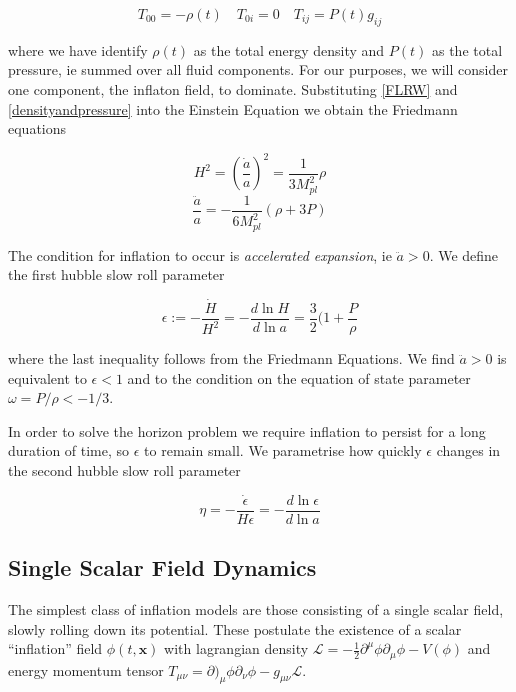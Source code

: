 \documentclass[a4paper,11pt]{article}
\renewcommand{\v}[1]{\mathbf{#1}}
\newcommand{\Mp}{M_{pl}}
\newcommand{\half}{\frac{1}{2}}
\begin{document}
\begin{equation}
\label{densityandpressure}
T_{00} = - \rho(t) \quad T_{0i} = 0 \quad T_{ij} = P(t)g_{ij}
\end{equation}

where we have identify $\rho(t)$ as the total energy density and $P(t)$ as the total pressure, ie summed over all fluid components. For our purposes, we will consider one component, the inflaton field, to dominate.  Substituting \ref{FLRW} and \ref{densityandpressure} into the Einstein Equation we obtain the Friedmann equations

\begin{equation}
H^2 = (\frac{\dot{a}}{a})^2 = \frac{1}{3\Mp^2}\rho
\tag{F1}
\label{F1}
\end{equation}
\begin{equation}
\frac{\ddot{a}}{a} = -\frac{1}{6\Mp^2}(\rho + 3P)
\tag{F2}
\label{F2}
\end{equation}

The condition for inflation to occur is \textit{accelerated expansion}, ie $\ddot{a} >0$. We define the first hubble slow roll parameter 

\begin{equation}
\label{epsilon}
\epsilon := -\frac{\dot{H}}{H^2} = -\frac{d\ln{H}}{d\ln{a}} = \frac{3}{2}(1+\frac{P}{\rho}
\end{equation}

where the last inequality follows from the Friedmann Equations. We find $\ddot{a} >0$ is equivalent to $\epsilon<1$ and to the condition on the equation of state parameter $\omega=P/\rho < -1/3$. 

In order to solve the horizon problem we require inflation to persist for a long duration of time, so $\epsilon$ to remain small. We parametrise how quickly $\epsilon$ changes in the second hubble slow roll parameter 

\begin{equation}
\eta = -\frac{\dot{\epsilon}}{H\epsilon} = -\frac{d\ln{\epsilon}}{d\ln{a}}
\end{equation}

\subsection{Single Scalar Field Dynamics}

The simplest class of inflation models are those consisting of a single scalar field, slowly rolling down its potential. These postulate the existence of a scalar ``inflation'' field $\phi(t,\v{x})$ with lagrangian density $\mathcal{L} = -\half \partial^\mu \phi \partial_\mu \phi - V(\phi)$ and energy momentum tensor $T_{\mu\nu}= \partial)_\mu \phi \partial_\nu \phi - g_{\mu\nu}\mathcal{L}$. \\
\end{document}
